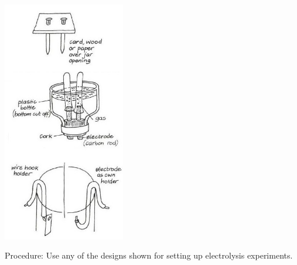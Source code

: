 \begin{multicols}{2}
\begin{center}
\includegraphics[width=0.4\textwidth]{./img/vso/electrolysis.jpg}
\end{center}

\begin{description*}
\item[Procedure:]{Use any of the designs shown for setting up electrolysis experiments.}
\end{description*}


\end{multicols}
